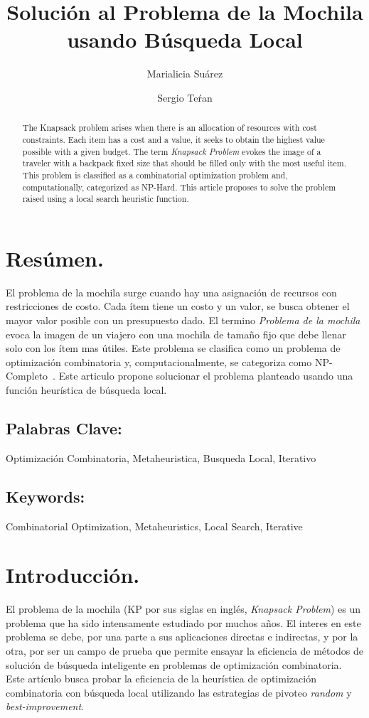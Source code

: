\documentclass{ci5652}
\title{Solución al Problema de la Mochila usando Búsqueda Local}
\author{Marialicia Suárez
        \and
        Sergio Teŕan}
\begin{document}
\thispagestyle{empty}
\maketitle


\section*{Resúmen.}
	El problema de la mochila surge cuando hay una asignación de recursos con restricciones de costo. Cada ítem tiene un costo y un valor, se busca obtener el mayor valor posible con un presupuesto dado. El termino \textit{Problema de la mochila} evoca la imagen de un viajero con una mochila de tamaño fijo que debe llenar solo con los ítem mas útiles. Este problema se clasifica como un problema de optimización combinatoria y, computacionalmente, se categoriza como NP-Completo~\cite{c_resumen_01}. Este articulo propone solucionar el problema planteado usando una función heurística de búsqueda local.

	\subsection*{Palabras Clave:}
	Optimización Combinatoria, Metaheuristica, Busqueda Local, Iterativo 

\begin{abstract}
	The Knapsack problem arises when there is an allocation of resources with cost constraints. Each item has a cost and a value, it seeks to obtain the highest value possible with a given budget. The term \textit{Knapsack Problem} evokes the image of a traveler with a backpack fixed size that should be filled only with the most useful item. This problem is classified as a combinatorial optimization problem and, computationally, categorized as NP-Hard. This article proposes to solve the problem raised using a local search heuristic function.
\end{abstract}

	\subsection*{Keywords:}
	Combinatorial Optimization, Metaheuristics, Local Search, Iterative

\section{Introducción.}

	El problema de la mochila (KP por sus siglas en inglés, \textit{Knapsack Problem}) es un problema que ha sido intensamente estudiado por muchos años. El interes en este problema se debe, por una parte a sus aplicaciones directas e indirectas, y por la otra, por ser un campo de prueba que permite ensayar la eficiencia de métodos de solución de búsqueda inteligente en problemas de optimización combinatoria. \\
	Este artículo busca probar la eficiencia de la heurística de optimización combinatoria con búsqueda local utilizando las estrategias de pivoteo \textit{random} y \textit{best-improvement}.
\end{document}
